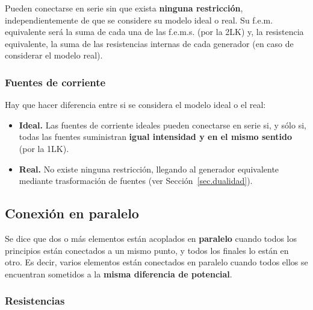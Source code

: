 \documentclass[11pt]{book} %
\begin{document}
		Pueden conectarse en serie sin que exista \textbf{ninguna restricción}, independientemente de que se considere su modelo ideal o real. Su f.e.m. equivalente será la suma de cada una de las f.e.m.s. (por la 2LK) y, la resistencia equivalente, la suma de las resistencias internas de cada generador (en caso de considerar el modelo real).
		
		\subsubsection{Fuentes de corriente} 
		
		Hay que hacer diferencia entre si se considera el modelo ideal o el real:
		\begin{itemize}
			\item \textbf{Ideal.} Las fuentes de corriente ideales pueden conectarse en serie si, y sólo si, todas las fuentes suministran \textbf{igual intensidad y en el mismo sentido} (por la 1LK).
			\item \textbf{Real.} No existe ninguna restricción, llegando al generador equivalente mediante trasformación de fuentes (ver Sección~\ref{sec.dualidad}). 
		\end{itemize}
	
	\subsection{Conexión en paralelo}
	Se dice que dos o más elementos están acoplados en \textbf{paralelo} cuando todos los principios están conectados a un mismo punto, y todos los finales lo están en otro. Es decir, varios elementos están conectados en paralelo cuando todos ellos se encuentran sometidos a la \textbf{misma diferencia de potencial}.
	
			\subsubsection{Resistencias} 
			
\end{document}
